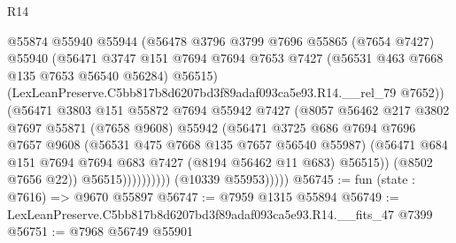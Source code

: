 \begin{lexlean}{R14}
\begin{coremodule}
                              @55874
                              @55940
                              @55944
                              (@56478
                                @3796
                                @3799
                                @7696
                                @55865
                                (@7654 @7427)
                                @55940
                                (@56471
                                  @3747
                                  @151
                                  @7694
                                  @7694
                                  @7653
                                  @7427
                                  (@56531 @463 @7668 @135 @7653 @56540 @56284)
                                  @56515)
                                (LexLeanPreserve.C5bb817b8d6207bd3f89adaf093ca5e93.R14.__rel_79
                                  @7652))
                              (@56471
                                @3803
                                @151
                                @55872
                                @7694
                                @55942
                                @7427
                                (@8057
                                  @56462
                                  @217
                                  @3802
                                  @7697
                                  @55871
                                  (@7658 @9608)
                                  @55942
                                  (@56471
                                    @3725
                                    @686
                                    @7694
                                    @7696
                                    @7657
                                    @9608
                                    (@56531 @475 @7668 @135 @7657 @56540 @55987)
                                    (@56471
                                      @684
                                      @151
                                      @7694
                                      @7694
                                      @683
                                      @7427
                                      (@8194 @56462 @11 @683)
                                      @56515))
                                  (@8502 @7656 @22))
                                @56515))))))))))
            (@10339 @55953)))))
@56745 := fun (state : @7616) => @9670 @55897
@56747 := @7959 @1315 @55894
@56749 := LexLeanPreserve.C5bb817b8d6207bd3f89adaf093ca5e93.R14.__fits_47 @7399
@56751 := @7968 @56749 @55901

\end{coremodule}
\end{lexlean}
